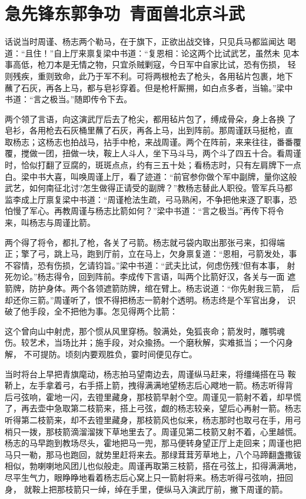 \chapter{急先锋东郭争功~青面兽北京斗武}

话说当时周谨、杨志两个勒马，在于旗下，正欲出战交锋，只见兵马都监闻达
喝道：“且住！”自上厅来禀复梁中书道：“复恩相：论这两个比试武艺，虽然未
见本事高低，枪刀本是无情之物，只宜杀贼剿寇，今日军中自家比试，恐有伤损，
轻则残疾，重则致命，此乃于军不利。可将两根枪去了枪头，各用毡片包裹，地下
蘸了石灰，再各上马，都与皂衫穿着。但是枪杆厮搠，如白点多者，当输。”梁中
书道：“言之极当。”随即传令下去。

两个领了言语，向这演武厅后去了枪尖，都用毡片包了，缚成骨朵，身上各换
了皂衫，各用枪去石灰桶里蘸了石灰，再各上马，出到阵前。那周谨跃马挺枪，直
取杨志；这杨志也拍战马，拈手中枪，来战周谨。两个在阵前，来来往往，番番覆
覆，搅做一团，扭做一块，鞍上人斗人，坐下马斗马，两个斗了四五十合。看周谨
时，恰似打翻了豆腐的，斑斑点点，约有三五十处；看杨志时，只有左肩牌下一点
白。梁中书大喜，叫唤周谨上厅，看了迹道：“前官参你做个军中副牌，量你这般
武艺，如何南征北讨?怎生做得正请受的副牌？”教杨志替此人职役。管军兵马都
监李成上厅禀复梁中书道：“周谨枪法生疏，弓马熟闲，不争把他来逐了职事，恐
怕慢了军心。再教周谨与杨志比箭如何？”梁中书道：“言之极当。”再传下将令
来，叫杨志与周谨比箭。

两个得了将令，都扎了枪，各关了弓箭。杨志就弓袋内取出那张弓来，扣得端
正；擎了弓，跳上马，跑到厅前，立在马上，欠身禀复道：“恩相，弓箭发处，事
不容情，恐有伤损，乞请钧旨。”梁中书道：“武夫比试，何虑伤残?但有本事，
射死勿论。”杨志得令，回到阵前。李成传下言语，叫两个比箭好汉，各关与一面
遮箭牌，防护身体。两个各领遮箭防牌，绾在臂上。杨志说道：“你先射我三箭，
后却还你三箭。”周谨听了，恨不得把杨志一箭射个透明。杨志终是个军官出身，
识破了他手段，全不把他为事。怎见得两个比箭：

这个曾向山中射虎，那个惯从风里穿杨。彀满处，兔狐丧命；箭发时，雕鹗魂
伤。较艺术，当场比并；施手段，对众揄扬。一个磨秋解，实难抵当；一个闪身解，
不可提防。顷刻内要观胜负，霎时间便见存亡。

当时将台上早把青旗麾动，杨志拍马望南边去，周谨纵马赶来，将缰绳搭在马
鞍鞒上，左手拿着弓，右手搭上箭，拽得满满地望杨志后心飕地一箭。杨志听得背
后弓弦响，霍地一闪，去镫里藏身，那枝箭早射个空。周谨见一箭射不着，却早慌
了，再去壶中急取第二枝箭来，搭上弓弦，觑的杨志较亲，望后心再射一箭。杨志
听得第二枝箭来，却不去镫里藏身，那枝箭风也似来，杨志那时也取弓在手，用弓
梢只一拨，那枝箭滴溜溜拨下草地里去了。周谨见第二枝箭又射不着，心里越慌。
杨志的马早跑到教场尽头，霍地把马一兜，那马便转身望正厅上走回来；周谨也把
马只一勒，那马也跑回，就势里赶将来去。那绿茸茸芳草地上，八个马蹄翻盏撒钹
相似，勃喇喇地风团儿也似般走。周谨再取第三枝箭，搭在弓弦上，扣得满满地，
尽平生气力，眼睁睁地看着杨志后心窝上只一箭射将来。杨志听得弓弦响，扭回身，
就鞍上把那枝箭只一绰，绰在手里，便纵马入演武厅前，撇下周谨的箭。

